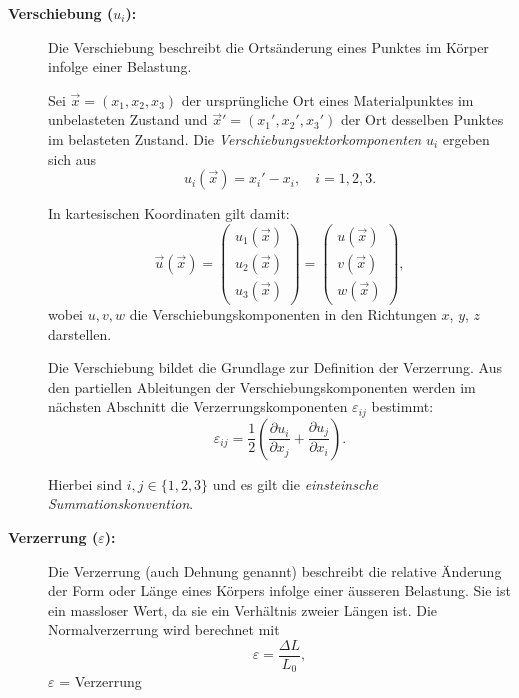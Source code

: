 \begin{description}
\item[\textbf{Verschiebung ($u_i$):}]
Die Verschiebung beschreibt die Ortsänderung eines Punktes im Körper
infolge einer Belastung.

Sei $\vec{x} = (x_1, x_2, x_3)$ der ursprüngliche Ort eines
Materialpunktes im unbelasteten Zustand und $\vec{x}' = (x_1', x_2',
x_3')$ der Ort desselben Punktes im belasteten Zustand.
Die \emph{Verschiebungsvektorkomponenten} $u_i$ ergeben sich aus
%
\begin{equation*}
	u_i(\vec{x}) = x_i' - x_i,
	\quad i = 1,2,3.
\end{equation*}

In kartesischen Koordinaten gilt damit:
\[
\vec{u}(\vec{x}) =
\begin{pmatrix}
	u_1(\vec{x}) \\
	u_2(\vec{x}) \\
	u_3(\vec{x})
\end{pmatrix}
=
\begin{pmatrix}
	u(\vec{x}) \\
	v(\vec{x}) \\
	w(\vec{x})
\end{pmatrix},
\]
wobei $u, v, w$ die Verschiebungskomponenten in den Richtungen $x$, $y$, $z$
darstellen.

Die Verschiebung bildet die Grundlage zur Definition der Verzerrung. 
Aus den partiellen Ableitungen der Verschiebungskomponenten werden
im nächsten Abschnitt die Verzerrungskomponenten $\varepsilon_{ij}$
bestimmt:
\begin{equation*}
	\varepsilon_{ij} = \frac{1}{2}
	\left(
	\frac{\partial u_i}{\partial x_j}
	+
	\frac{\partial u_j}{\partial x_i}
	\right).
\end{equation*}

Hierbei sind $i,j \in \{1,2,3\}$ und es gilt die
\emph{einsteinsche Summationskonvention}.
%

\item[\textbf{Verzerrung ($\varepsilon$):}]
Die Verzerrung (auch Dehnung genannt) beschreibt die relative
%
%
Änderung der Form oder Länge eines Körpers infolge einer äusseren
Belastung.
Sie ist ein massloser Wert, da sie ein Verhältnis zweier Längen ist.
Die Normalverzerrung wird berechnet mit
	\begin{equation*}
		\varepsilon 
		= \frac{\Delta L}{L_0},
	\end{equation*}
	$\varepsilon$ = Verzerrung
	

\end{description}

